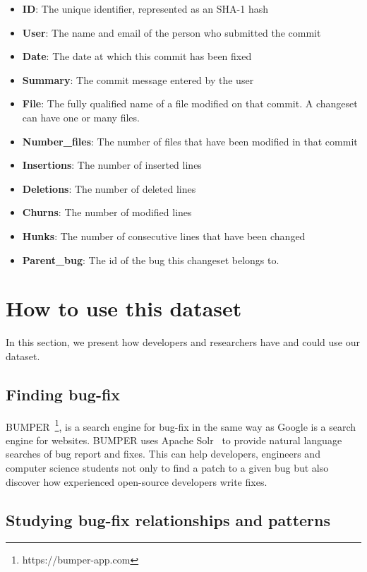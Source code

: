 \documentclass{sig-alternate-05-2015}
\begin{document}
\begin{itemize}

  \item 	\textbf{ID}: The unique identifier, represented as an SHA-1
  hash
  \item 	\textbf{User}: The name and email of the person who
  submitted the commit
  \item 	\textbf{Date}: The date at which this commit has been fixed
  \item 	\textbf{Summary}: The commit message entered by the user
  \item 	\textbf{File}: The fully qualified name of a file modified on
  that commit. A changeset can have one or many files.
  \item 	\textbf{Number\_files}: The number of files that have been
  modified in that commit
  \item 	\textbf{Insertions}: The number of inserted lines
  \item 	\textbf{Deletions}: The number of deleted lines
  \item 	\textbf{Churns}: The number of modified lines
  \item 	\textbf{Hunks}: The number of consecutive lines that have
  been changed
  \item 	\textbf{Parent\_bug}: The id of the bug this changeset belongs
  to.
\end{itemize}


\section{How to use this dataset}

In this section, we present how developers and researchers have and could use our dataset.

\subsection{Finding bug-fix}
\label{subs:Bug Fixing}

BUMPER~\cite{Nayrolles2015d,Nayrolles2016}\footnote{https://bumper-app.com}, is a search engine for bug-fix in the same way as Google is a search engine for websites. BUMPER uses Apache Solr~\cite{Nayrolles2014b} to provide natural language searches of bug report and fixes.
This can help developers, engineers and computer science students not only to find a patch to a given bug but also discover how experienced open-source developers write fixes.

\subsection{Studying bug-fix relationships and patterns}
\label{subs:Studying bug-fix relationships}
\end{document}
